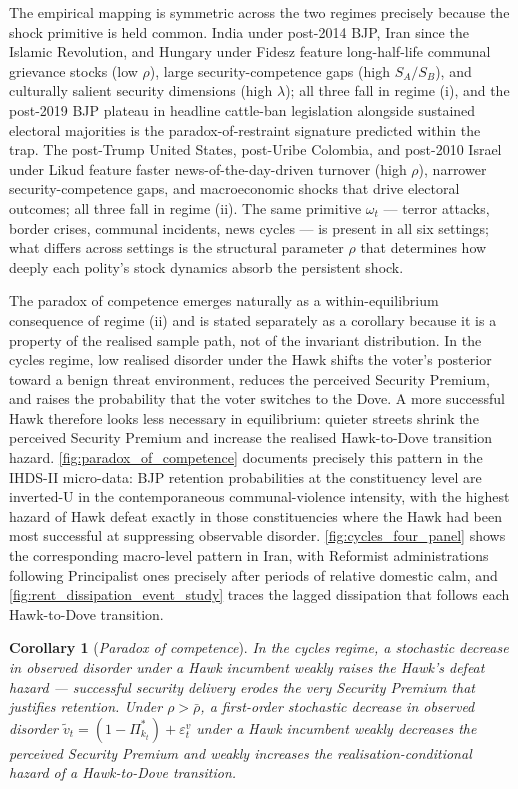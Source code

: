 \documentclass[11pt,twoside]{extarticle}
\newtheorem{corollary}{Corollary}
\begin{document}
The empirical mapping is symmetric across the two regimes precisely because the shock primitive is held common. India under post-2014 BJP, Iran since the Islamic Revolution, and Hungary under Fidesz feature long-half-life communal grievance stocks (low $\rho$), large security-competence gaps (high $S_A/S_B$), and culturally salient security dimensions (high $\lambda$); all three fall in regime (i), and the post-2019 BJP plateau in headline cattle-ban legislation alongside sustained electoral majorities is the paradox-of-restraint signature predicted within the trap. The post-Trump United States, post-Uribe Colombia, and post-2010 Israel under Likud feature faster news-of-the-day-driven turnover (high $\rho$), narrower security-competence gaps, and macroeconomic shocks that drive electoral outcomes; all three fall in regime (ii). The same primitive $\omega_t$ — terror attacks, border crises, communal incidents, news cycles — is present in all six settings; what differs across settings is the structural parameter $\rho$ that determines how deeply each polity's stock dynamics absorb the persistent shock.

The paradox of competence emerges naturally as a within-equilibrium consequence of regime (ii) and is stated separately as a corollary because it is a property of the realised sample path, not of the invariant distribution. In the cycles regime, low realised disorder under the Hawk shifts the voter's posterior toward a benign threat environment, reduces the perceived Security Premium, and raises the probability that the voter switches to the Dove. A more successful Hawk therefore looks less necessary in equilibrium: quieter streets shrink the perceived Security Premium and increase the realised Hawk-to-Dove transition hazard. \autoref{fig:paradox_of_competence} documents precisely this pattern in the IHDS-II micro-data: BJP retention probabilities at the constituency level are inverted-U in the contemporaneous communal-violence intensity, with the highest hazard of Hawk defeat exactly in those constituencies where the Hawk had been most successful at suppressing observable disorder. \autoref{fig:cycles_four_panel} shows the corresponding macro-level pattern in Iran, with Reformist administrations following Principalist ones precisely after periods of relative domestic calm, and \autoref{fig:rent_dissipation_event_study} traces the lagged dissipation that follows each Hawk-to-Dove transition.

\begin{corollary}[\emph{Paradox of competence}]\label{cor:paradox_v2}
\emph{In the cycles regime, a stochastic decrease in observed disorder under a Hawk incumbent weakly raises the Hawk's defeat hazard — successful security delivery erodes the very Security Premium that justifies retention.}
Under $\rho>\bar\rho$, a first-order stochastic decrease in observed disorder $\tilde v_t=(1-\Pi_{k_t}^*)+\varepsilon_t^v$ under a Hawk incumbent weakly decreases the perceived Security Premium and weakly increases the realisation-conditional hazard of a Hawk-to-Dove transition.
\end{corollary}
\end{document}
